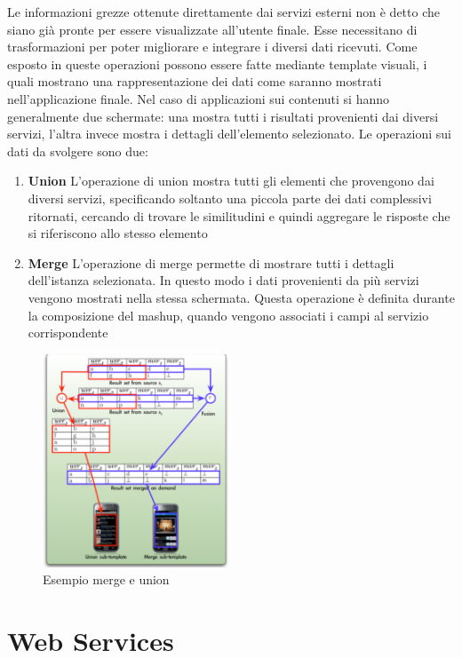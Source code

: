 Le informazioni grezze ottenute direttamente dai servizi esterni non è detto che siano già pronte per essere visualizzate all'utente finale. Esse necessitano di trasformazioni per poter migliorare e integrare i diversi dati ricevuti. Come esposto in \cite{caio2011tesi} queste operazioni possono essere fatte mediante template visuali, i quali mostrano una rappresentazione dei dati come saranno mostrati nell'applicazione finale. Nel caso di applicazioni sui contenuti si hanno generalmente due schermate: una mostra tutti i risultati provenienti dai diversi servizi, l'altra invece mostra i dettagli dell'elemento selezionato. Le operazioni sui dati da svolgere sono due:

\begin{enumerate}
	\item \textbf{Union} L'operazione di union mostra tutti gli elementi che provengono dai diversi servizi, specificando soltanto una piccola parte dei dati complessivi ritornati, cercando di trovare le similitudini e quindi aggregare le risposte che si riferiscono allo stesso elemento
	\item \textbf{Merge} L'operazione di merge permette di mostrare tutti i dettagli dell'istanza selezionata. In questo modo i dati provenienti da più servizi vengono mostrati nella stessa schermata. Questa operazione è definita durante la composizione del mashup, quando vengono associati i campi al servizio corrispondente
\end{enumerate}

\begin{figure}[ht]
	\centering
	\includegraphics[width=0.5\textwidth]{2-nozioni-preliminari/Immagini/merge-union.png}
	\caption{Esempio merge e union}\label{fig:merge-union}
\end{figure}

\section{Web Services\label{sec:web-services}}

